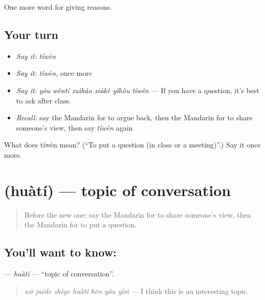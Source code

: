\begin{grammarlens}[title={What you've built}]
One more word for giving reasons.
\end{grammarlens}

\subsection*{Your turn}
\begin{itemize}
\raggedright
  \item \emph{Say it:} \emph{tíwèn}
  \item \emph{Say it:} \emph{tíwèn}, once more
  \item \emph{Say it:} \emph{yǒu wèntí zuìhǎo xiàkè yǐhòu tíwèn} — If you have a question, it's best to ask after class.
  \item \emph{Recall:} say the Mandarin for to argue back, then the Mandarin for to share someone's view, then say \emph{tíwèn} again
\end{itemize}

\begin{tcolorbox}[breakable,colback=teal!4,colframe=teal!35!black,title={Before you move on}]
What does tíwèn mean? (\textquotedblleft{}To put a question (in class or a meeting)\textquotedblright{}.) Say it once more.
\end{tcolorbox}
\section[\texorpdfstring{\zh{话题} (huàtí)}{话题 (huàtí)}]{ (huàtí) — topic of conversation}

\label{lesson:ZH-C354-huati}



\begin{quote}
Before the new one: say the Mandarin for to share someone's view, then the Mandarin for to put a question.
\end{quote}

\subsection*{You'll want to know: }
\textbf{} — \emph{huàtí} — \textquotedblleft{}topic of conversation\textquotedblright{}.

\begin{quote}
\textbf{} \emph{wǒ juéde zhège huàtí hěn yǒu yìsi} — I think this is an interesting topic.
\end{quote}

